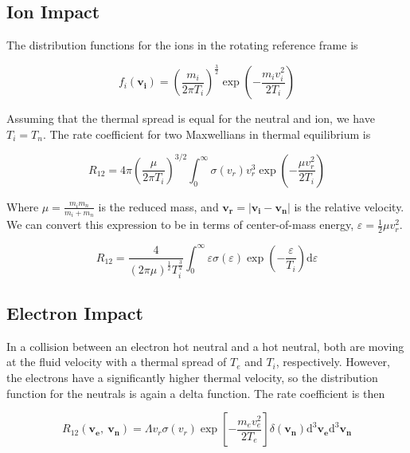 \documentclass[11pt]{article}
\begin{document}
\subsection{Ion Impact}

The distribution functions for the ions in the rotating reference frame is

\begin{equation}
	f_i(\mathbf{v_i}) = \left( \frac{m_i}{2 \pi T_i} \right)^{\frac{3}{2}} \exp \left( -\frac{m_i v_i^2}{2 T_i} \right)  
\end{equation}

Assuming that the thermal spread is equal for the neutral and ion, we have $T_i = T_n$. The rate coefficient for two Maxwellians in thermal equilibrium is

\begin{equation}
	R_{12} = 4 \pi \left( \frac{\mu}{2 \pi T_i} \right)^{3/2} \int_0^\infty \sigma(v_r) v_r^3 \exp{ \left( -\frac{\mu v_r^2}{2 T_i} \right) }
\end{equation}

Where $\mu = \frac{m_i m_n}{m_i + m_n}$ is the reduced mass, and $\mathbf{v_r} = |\mathbf{v_i} - \mathbf{v_n}|$ is the relative velocity. We can convert this expression to be in terms of center-of-mass energy, $\varepsilon = \frac{1}{2} \mu v_r^2$.

\begin{equation}
	R_{12} = \frac{4}{(2 \pi \mu)^{\frac{1}{2}} T_i^{\frac{3}{2}}} \int_0^\infty \varepsilon \sigma(\varepsilon) \exp{ \left( -\frac{\varepsilon}{T_i} \right) } \mathrm{d} \varepsilon
\end{equation}

\subsection{Electron Impact}

In a collision between an electron hot neutral and a hot neutral, both are moving at the fluid velocity with a thermal spread of $T_e$ and $T_i$, respectively. However, the electrons have a significantly higher thermal velocity, so the distribution function for the neutrals is again a delta function. The rate coefficient is then

\begin{equation}
	R_{12} (\mathbf{v_e},\ \mathbf{v_n}) = \Lambda v_r \sigma(v_r) \exp \left[ - \frac{m_e v_e^2}{2 T_e} \right] \delta( \mathbf{v_n} ) \mathrm{d}^3 \mathbf{v_e} \mathrm{d}^3 \mathbf{v_n}
\end{equation}
\end{document}
